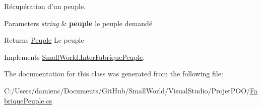 Récupération d'un peuple. 


\begin{DoxyParams}{Parameters}
{\em string} & {\bfseries peuple} le peuple demandé \\
\hline
\end{DoxyParams}
\begin{DoxyReturn}{Returns}
\hyperlink{class_small_world_1_1_peuple}{Peuple} Le peuple 
\end{DoxyReturn}


Implements \hyperlink{interface_small_world_1_1_inter_fabrique_peuple_a5f4c738231b141ffc6afd295d259a80a}{Small\-World.\-Inter\-Fabrique\-Peuple}.



The documentation for this class was generated from the following file\-:\begin{DoxyCompactItemize}
\item 
C\-:/\-Users/damienc/\-Documents/\-Git\-Hub/\-Small\-World/\-Visual\-Studio/\-Projet\-P\-O\-O/\hyperlink{_fabrique_peuple_8cs}{Fabrique\-Peuple.\-cs}\end{DoxyCompactItemize}
